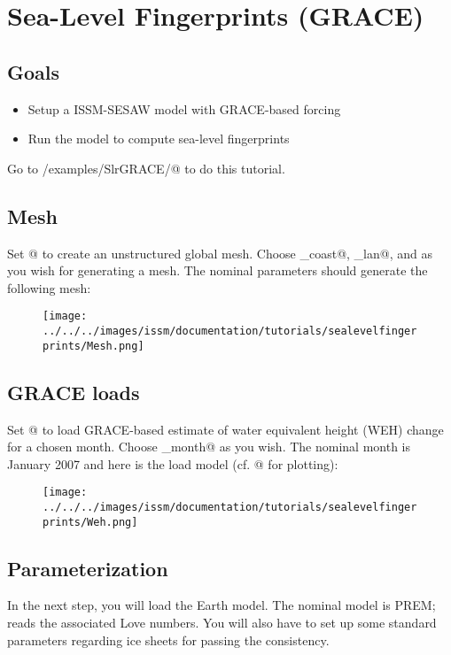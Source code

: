 \section{Sea-Level Fingerprints (GRACE)}
\subsection{Goals} %
\begin{itemize}
	\item Setup a ISSM-SESAW model with GRACE-based forcing
	\item Run the model to compute sea-level fingerprints
\end{itemize}

Go to \verb@trunk/examples/SlrGRACE/@ to do this tutorial.

\subsection{Mesh} %
Set @ to create an unstructured global mesh. Choose \verb@mindistance_coast@,
\verb@mindistance_lan@, and \verb@maxdistance@ as you wish for generating a mesh. The nominal
parameters should generate the following mesh:
\begin{figure}[H]
	\begin{center}
		\texttt{[image: ../../../images/issm/documentation/tutorials/sealevelfingerprints/Mesh.png]}
	\end{center}
\end{figure}
\subsection{GRACE loads} %
Set @ to load GRACE-based estimate of water equivalent height (WEH) change for a chosen
month. Choose \verb@year_month@ as you wish. The nominal month is January 2007 and here is the load
model (cf. @ for plotting):
\begin{figure}[H]
	\begin{center}
		\texttt{[image: ../../../images/issm/documentation/tutorials/sealevelfingerprints/Weh.png]}
	\end{center}
\end{figure}
\subsection{Parameterization} %
In the next step, you will load the Earth model. The nominal model is PREM; \verb@lovenumbers@ reads
the associated Love numbers. You will also have to set up some standard parameters regarding ice
sheets for passing the consistency.
